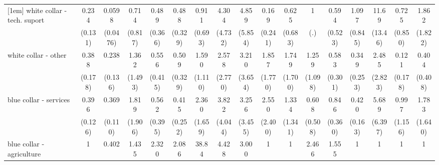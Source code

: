 {\begin{tabular}{l*{16}{c}}
[1em]
white collar - tech. suport&       0.234\sym{**} &      0.0598\sym{***}&       0.714         &       0.489         &       0.488         &       0.911         &       4.304         &       4.859         &       0.169         &       0.625         &           1         &       0.594         &       1.097         &       11.69\sym{*}  &       0.725         &       1.862         \\
                    &     (0.131)         &    (0.0476)         &     (0.817)         &     (0.366)         &     (0.329)         &     (0.693)         &     (4.732)         &     (5.854)         &     (0.241)         &     (0.683)         &         (.)         &     (0.523)         &     (0.845)         &     (13.46)         &     (0.850)         &     (1.822)         \\
[1em]
white collar - other&       0.388\sym{*}  &       0.238\sym{*}  &       1.362         &       0.556         &       0.509         &       1.590         &       2.578         &       3.210         &       1.857         &       1.749         &       1.259         &       0.583         &       0.349         &       2.485         &       0.121         &       0.404         \\
                    &     (0.178)         &     (0.136)         &     (1.493)         &     (0.415)         &     (0.329)         &     (1.110)         &     (2.770)         &     (3.654)         &     (1.770)         &     (1.700)         &     (1.098)         &     (0.301)         &     (0.253)         &     (2.823)         &     (0.178)         &     (0.408)         \\
[1em]
blue collar - services&       0.396\sym{**} &       0.369\sym{***}&       1.819         &       0.562         &       0.415         &       2.360         &       3.822         &       3.256         &       2.550         &       1.334         &       0.608         &       0.846         &       0.420\sym{*}  &       5.689         &       0.997         &       1.783         \\
                    &     (0.126)         &     (0.110)         &     (1.906)         &     (0.395)         &     (0.252)         &     (1.659)         &     (4.044)         &     (3.455)         &     (2.400)         &     (1.341)         &     (0.508)         &     (0.360)         &     (0.163)         &     (6.397)         &     (1.156)         &     (1.640)         \\
[1em]
blue collar - agriculture&           1         &       0.402         &       1.435         &       2.320         &       2.086         &       38.84\sym{*}  &       4.428         &       3.000         &           1         &           1         &       2.466         &       1.555         &           1         &           1         &           1         &           1         \\

\end{tabular}}
